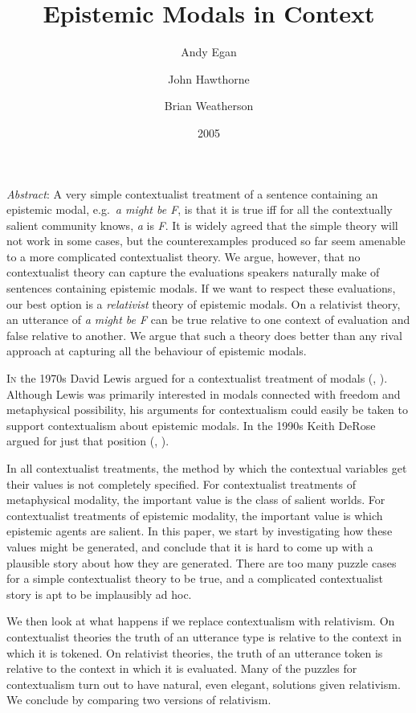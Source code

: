 \documentclass[
  11pt,
  letterpaper,
  DIV=11,
  numbers=noendperiod,
  twoside]{scrartcl}
\title{Epistemic Modals in Context}
\author{Andy Egan \and John Hawthorne \and Brian Weatherson}
\date{2005}
\renewenvironment{abstract}
 {\vspace{-1.25cm}
 \quotation\small\noindent\emph{Abstract}:}
 {\endquotation}
\renewenvironment{abstract}
 {\quotation\small\noindent\emph{Abstract}:}
 {\endquotation\vspace{-0.02cm}}
\begin{document}
\maketitle
\begin{abstract}
A very simple contextualist treatment of a sentence containing an
epistemic modal, e.g.~\emph{a might be F}, is that it is true iff for
all the contextually salient community knows, \emph{a} is \emph{F}. It
is widely agreed that the simple theory will not work in some cases, but
the counterexamples produced so far seem amenable to a more complicated
contextualist theory. We argue, however, that no contextualist theory
can capture the evaluations speakers naturally make of sentences
containing epistemic modals. If we want to respect these evaluations,
our best option is a \emph{relativist} theory of epistemic modals. On a
relativist theory, an utterance of \emph{a might be F} can be true
relative to one context of evaluation and false relative to another. We
argue that such a theory does better than any rival approach at
capturing all the behaviour of epistemic modals.
\end{abstract}


\lettrine{I}{n} the 1970s David Lewis argued for a contextualist
treatment of modals (,
). Although Lewis was primarily
interested in modals connected with freedom and metaphysical
possibility, his arguments for contextualism could easily be taken to
support contextualism about epistemic modals. In the 1990s Keith DeRose
argued for just that position (,
).

In all contextualist treatments, the method by which the contextual
variables get their values is not completely specified. For
contextualist treatments of metaphysical modality, the important value
is the class of salient worlds. For contextualist treatments of
epistemic modality, the important value is which epistemic agents are
salient. In this paper, we start by investigating how these values might
be generated, and conclude that it is hard to come up with a plausible
story about how they are generated. There are too many puzzle cases for
a simple contextualist theory to be true, and a complicated
contextualist story is apt to be implausibly ad hoc.

We then look at what happens if we replace contextualism with
relativism. On contextualist theories the truth of an utterance type is
relative to the context in which it is tokened. On relativist theories,
the truth of an utterance token is relative to the context in which it
is evaluated. Many of the puzzles for contextualism turn out to have
natural, even elegant, solutions given relativism. We conclude by
comparing two versions of relativism.
\end{document}

